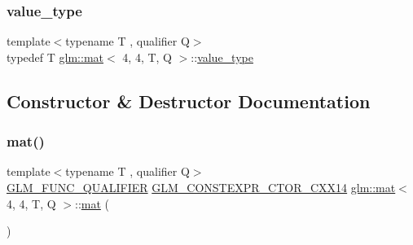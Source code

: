 \mbox{\label{structglm_1_1mat_3_014_00_014_00_01_t_00_01_q_01_4_ae564877d4d3802415244ba1c83cc4c89}} 
\subsubsection{\texorpdfstring{value\+\_\+type}{value\_type}}
{\footnotesize\ttfamily template$<$typename T , qualifier Q$>$ \\
typedef T \mbox{\hyperlink{structglm_1_1mat}{glm\+::mat}}$<$ 4, 4, T, Q $>$\+::\mbox{\hyperlink{structglm_1_1mat_3_014_00_014_00_01_t_00_01_q_01_4_ae564877d4d3802415244ba1c83cc4c89}{value\+\_\+type}}}



\subsection{Constructor \& Destructor Documentation}
\mbox{\label{structglm_1_1mat_3_014_00_014_00_01_t_00_01_q_01_4_ad5a56ae437785b4a19e5423d00e34f80}} 
\subsubsection{\texorpdfstring{mat()}{mat()}\hspace{0.1cm}{\footnotesize\ttfamily [1/21]}}
{\footnotesize\ttfamily template$<$typename T , qualifier Q$>$ \\
\mbox{\hyperlink{setup_8hpp_a33fdea6f91c5f834105f7415e2a64407}{G\+L\+M\+\_\+\+F\+U\+N\+C\+\_\+\+Q\+U\+A\+L\+I\+F\+I\+ER}} \mbox{\hyperlink{setup_8hpp_a0900f9145e68bf6061b6f5e7be3fa751}{G\+L\+M\+\_\+\+C\+O\+N\+S\+T\+E\+X\+P\+R\+\_\+\+C\+T\+O\+R\+\_\+\+C\+X\+X14}} \mbox{\hyperlink{structglm_1_1mat}{glm\+::mat}}$<$ 4, 4, T, Q $>$\+::\mbox{\hyperlink{structglm_1_1mat}{mat}} (\begin{DoxyParamCaption}{ }\end{DoxyParamCaption})}

\mbox{\label{structglm_1_1mat_3_014_00_014_00_01_t_00_01_q_01_4_a3df7423fcb4eb04f5ad5e24ce5a8d7ca}} 
